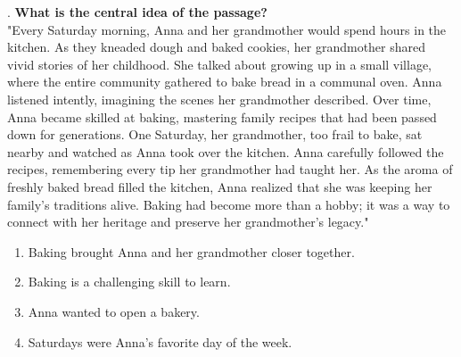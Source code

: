 \documentclass[12pt]{article}
\begin{document}
\vspace{1cm}
. \textbf{What is the central idea of the passage?\\}
"Every Saturday morning, Anna and her grandmother would spend hours in the kitchen. As they kneaded dough and baked cookies, her grandmother shared vivid stories of her childhood. She talked about growing up in a small village, where the entire community gathered to bake bread in a communal oven. Anna listened intently, imagining the scenes her grandmother described. Over time, Anna became skilled at baking, mastering family recipes that had been passed down for generations. One Saturday, her grandmother, too frail to bake, sat nearby and watched as Anna took over the kitchen. Anna carefully followed the recipes, remembering every tip her grandmother had taught her. As the aroma of freshly baked bread filled the kitchen, Anna realized that she was keeping her family’s traditions alive. Baking had become more than a hobby; it was a way to connect with her heritage and preserve her grandmother’s legacy."  
\begin{enumerate}[label=\Alph*.]
    \item Baking brought Anna and her grandmother closer together.  
    \item Baking is a challenging skill to learn.  
    \item Anna wanted to open a bakery.  
    \item Saturdays were Anna’s favorite day of the week.  
\end{enumerate}

\vspace{0.5cm}
\end{document}
